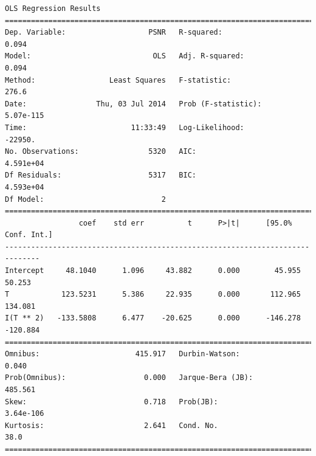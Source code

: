 \documentclass[11pt]{article}
\theoremstyle{definition}
\begin{document}
{\begin{lstlisting}[caption = Time Series 1 - Non-Local Means OLS Model - T Only, label = {nlmeanst1}]
                            OLS Regression Results                            
==============================================================================
Dep. Variable:                   PSNR   R-squared:                       0.094
Model:                            OLS   Adj. R-squared:                  0.094
Method:                 Least Squares   F-statistic:                     276.6
Date:                Thu, 03 Jul 2014   Prob (F-statistic):          5.07e-115
Time:                        11:33:49   Log-Likelihood:                -22950.
No. Observations:                5320   AIC:                         4.591e+04
Df Residuals:                    5317   BIC:                         4.593e+04
Df Model:                           2                                         
==============================================================================
                 coef    std err          t      P>|t|      [95.0% Conf. Int.]
------------------------------------------------------------------------------
Intercept     48.1040      1.096     43.882      0.000        45.955    50.253
T            123.5231      5.386     22.935      0.000       112.965   134.081
I(T ** 2)   -133.5808      6.477    -20.625      0.000      -146.278  -120.884
==============================================================================
Omnibus:                      415.917   Durbin-Watson:                   0.040
Prob(Omnibus):                  0.000   Jarque-Bera (JB):              485.561
Skew:                           0.718   Prob(JB):                    3.64e-106
Kurtosis:                       2.641   Cond. No.                         38.0
==============================================================================
\end{lstlisting}

}
\end{document}
